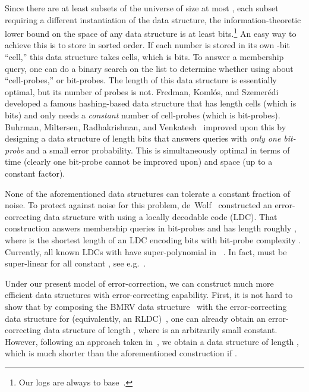 \documentclass[11pt,english]{article}
\theoremstyle{definition}
\theoremstyle{remark}
\begin{document}
Since there are at least  subsets of the universe of
size at most , each subset requiring a different instantiation
of the data structure, the information-theoretic lower bound on the
space of any data structure is at least 
bits.\footnote{Our logs are always to base~.}
An easy way to achieve this is to store  in sorted order. If
each number is stored in its own -bit ``cell,'' this
data structure takes  cells, which is  bits. To answer
a membership query, one can do a binary search on the list to determine
whether  using about  ``cell-probes,'' or 
bit-probes. The length of this data structure is essentially optimal,
but its number of probes is not. Fredman, Koml\'{o}s, and Szemer\'{e}di~\cite{fks:sparsetable}
developed a famous hashing-based data structure that has length 
cells (which is  bits) and only needs a \emph{constant}
number of cell-probes (which is  bit-probes). Buhrman,
Miltersen, Radhakrishnan, and Venkatesh~\cite{bmrv:bitvectorsj}
improved upon this by designing a data structure of length 
bits that answers queries with \emph{only one bit-probe} and a small error probability. 
This is simultaneously optimal in terms of time (clearly one bit-probe cannot
be improved upon) and space (up to a constant factor).

None of the aforementioned data structures can tolerate a constant fraction of noise.
To protect against noise for this problem, de~Wolf~\cite{wolf:ecdata}
constructed an error-correcting data structure with  using
a locally decodable code (LDC). That construction
answers membership queries in  bit-probes and has length roughly
, where  is the shortest length of an LDC encoding
 bits with bit-probe complexity . Currently, all known LDCs with  have  super-polynomial in ~\cite{bikr:improvedpir,yekhanin:3ldcj,efremenko:ldc}.
In fact,  must be super-linear for all constant , see e.g.~\cite{katz&trevisan:ldc,kerenidis&wolf:qldcj,woodruff:ldclower}.

Under our present model of error-correction, we can construct much
more efficient data structures with error-correcting capability. First,
it is not hard to show that by composing the BMRV data structure~\cite{bmrv:bitvectorsj}
with the error-correcting data structure for  (equivalently,
an RLDC)~\cite{bghsv04}, one can already obtain an error-correcting
data structure of length , where  is
an arbitrarily small constant. However, following an approach taken
in~\cite{wolf:ecdata}, we obtain a data structure of length ,
which is much shorter than the aforementioned construction if .
\end{document}
